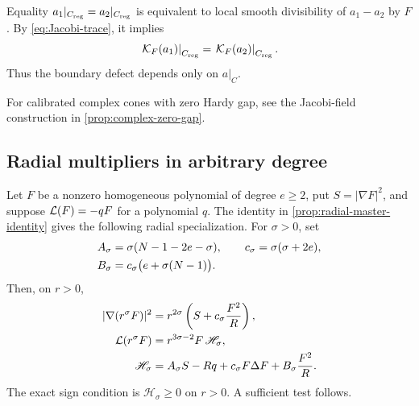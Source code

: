 \begin{remark}
Equality \(a_1|_{C_{\rm reg}}=a_2|_{C_{\rm reg}}\) is equivalent to
local smooth divisibility of \(a_1-a_2\) by \(F\). By
\eqref{eq:Jacobi-trace}, it implies
\begin{equation}\label{eq:boundary-ideal-class}
 \left.\mathcal K_F(a_1)\right|_{C_{\rm reg}}
 =\left.\mathcal K_F(a_2)\right|_{C_{\rm reg}}.
\end{equation}
Thus the boundary defect depends only on \(a|_C\).
\end{remark}

For calibrated complex cones with zero Hardy gap, see the
Jacobi-field construction in \cref{prop:complex-zero-gap}.



\subsection{Radial multipliers in arbitrary degree}
\label{sec:general-radial-multipliers}

Let \(F\) be a nonzero homogeneous polynomial of degree \(e\ge2\),
put \(S=|\nabla F|^2\), and suppose \(\mathcal L(F)=-qF\) for a
polynomial \(q\).
The identity in \cref{prop:radial-master-identity} gives the following
radial specialization.
For \(\sigma>0\), set
\begin{align}
 A_\sigma&=\sigma(N-1-2e-\sigma),\qquad
 c_\sigma=\sigma(\sigma+2e),\notag\\
 B_\sigma&=c_\sigma\bigl(e+\sigma(N-1)\bigr).
 \label{eq:general-radial-coefficients}
\end{align}
Then, on \(r>0\),
\begin{align}
 |\nabla(r^\sigma F)|^2
 &=r^{2\sigma}\left(S+c_\sigma\frac{F^2}{R}\right),
 \label{eq:general-radial-gradient}\\
 \mathcal L(r^\sigma F)&=r^{3\sigma-2}F\,\mathscr H_\sigma,
 \label{eq:general-radial-defect}\\
 \mathscr H_\sigma
 &=A_\sigma S-Rq+c_\sigma F\Delta F
                  +B_\sigma\frac{F^2}{R}.
 \label{eq:general-radial-bracket}
\end{align}
The exact sign condition is \(\mathscr H_\sigma\ge0\) on \(r>0\).
A sufficient test follows.

